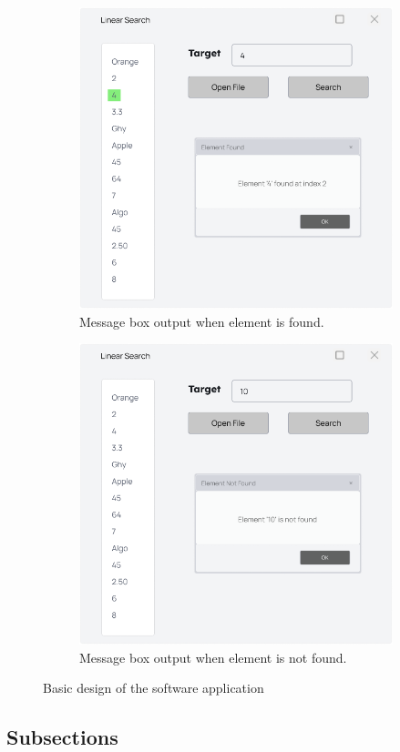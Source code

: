 \documentclass[12pt,a4paper]{article}
\begin{document}
    \begin{figure}[h]
        \centering
        \begin{subfigure}[b]{0.45\linewidth}
            \includegraphics[width=\linewidth]{Prototype.png} 
            \caption{Message box output when element is found.}
            \label{fig:sub1}
        \end{subfigure}
        \hfill
        \begin{subfigure}[b]{0.45\linewidth}
            \includegraphics[width=\linewidth]{Prototype-2.png}
            \caption{Message box output when element is not found.}
            \label{fig:sub2}
        \end{subfigure}
        \caption{Basic design of the software application}
        \label{fig:overall}
    \end{figure}
\subsection{Subsections}
\end{document}
